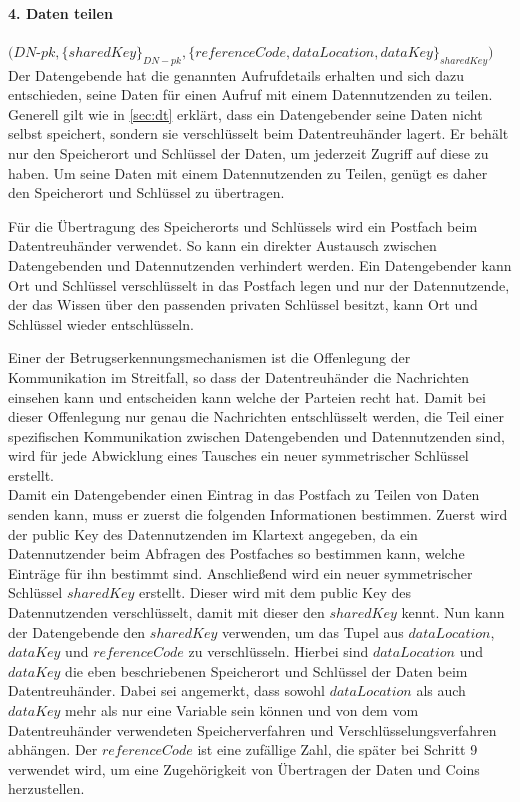 \documentclass{scrreprt}
\begin{document}
\paragraph{4. Daten teilen} $(DN$-$pk, \{sharedKey\}_{DN-pk}, \{referenceCode, dataLocation, dataKey\}_{sharedKey})$\\
Der Datengebende hat die genannten Aufrufdetails erhalten und sich dazu entschieden, seine Daten für einen Aufruf mit einem Datennutzenden zu teilen. Generell gilt wie in \ref{sec:dt} erklärt, dass ein Datengebender seine Daten nicht selbst speichert, sondern sie verschlüsselt beim Datentreuhänder lagert. Er behält nur den Speicherort und Schlüssel der Daten, um jederzeit Zugriff auf diese zu haben. Um seine Daten mit einem Datennutzenden zu Teilen, genügt es daher den Speicherort und Schlüssel zu übertragen.

Für die Übertragung des Speicherorts und Schlüssels wird ein Postfach beim Datentreuhänder verwendet. So kann ein direkter Austausch zwischen Datengebenden und Datennutzenden verhindert werden. Ein Datengebender kann Ort und Schlüssel verschlüsselt in das Postfach legen und nur der Datennutzende, der das Wissen über den passenden privaten Schlüssel besitzt, kann Ort und Schlüssel wieder entschlüsseln.

Einer der Betrugserkennungsmechanismen ist die Offenlegung der Kommunikation im Streitfall, so dass der Datentreuhänder die Nachrichten einsehen kann und entscheiden kann welche der Parteien recht hat. Damit bei dieser Offenlegung nur genau die Nachrichten entschlüsselt werden, die Teil einer spezifischen Kommunikation zwischen Datengebenden und Datennutzenden sind, wird für jede Abwicklung eines Tausches ein neuer symmetrischer Schlüssel erstellt.\\

Damit ein Datengebender einen Eintrag in das Postfach zu Teilen von Daten senden kann, muss er zuerst die folgenden Informationen bestimmen. Zuerst wird der public Key des Datennutzenden im Klartext angegeben, da ein Datennutzender beim Abfragen des Postfaches so bestimmen kann, welche Einträge für ihn bestimmt sind. Anschließend wird ein neuer symmetrischer Schlüssel $sharedKey$ erstellt. Dieser wird mit dem public Key des Datennutzenden verschlüsselt, damit mit dieser den $sharedKey$ kennt. Nun kann der Datengebende den $sharedKey$ verwenden, um das Tupel aus $dataLocation$, $dataKey$ und $referenceCode$ zu verschlüsseln. Hierbei sind $dataLocation$ und $dataKey$ die eben beschriebenen Speicherort und Schlüssel der Daten beim Datentreuhänder. Dabei sei angemerkt, dass sowohl $dataLocation$ als auch $dataKey$ mehr als nur eine Variable sein können und von dem vom Datentreuhänder verwendeten Speicherverfahren und Verschlüsselungsverfahren abhängen. Der $referenceCode$ ist eine zufällige Zahl, die später bei Schritt 9 verwendet wird, um eine Zugehörigkeit von Übertragen der Daten und Coins herzustellen.
\end{document}
